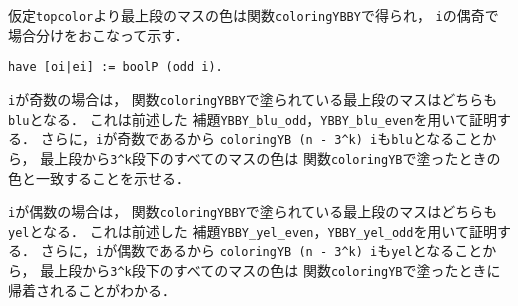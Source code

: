 仮定{\tt{topcolor}}より最上段のマスの色は関数{\tt{coloringYBBY}}で得られ，
{\tt{i}}の偶奇で場合分けをおこなって示す．
\begin{lstlisting}[language=Coq]
  have [oi|ei] := boolP (odd i).
\end{lstlisting}

{\tt{i}}が奇数の場合は，
関数{\tt{coloringYBBY}}で塗られている最上段のマスはどちらも{\tt{blu}}となる．
これは前述した
補題{\tt{YBBY\_blu\_odd}}，{\tt{YBBY\_blu\_even}}を用いて証明する．
さらに，{\tt{i}}が奇数であるから
{\tt{coloringYB (n - 3\verb|^|k) i}}も{\tt{blu}}となることから，
最上段から{\tt{3\verb|^|k}}段下のすべてのマスの色は
関数{\tt{coloringYB}}で塗ったときの色と一致することを示せる．

{\tt{i}}が偶数の場合は，
関数{\tt{coloringYBBY}}で塗られている最上段のマスはどちらも{\tt{yel}}となる．
これは前述した
補題{\tt{YBBY\_yel\_even}}，{\tt{YBBY\_yel\_odd}}を用いて証明する．
さらに，{\tt{i}}が偶数であるから
{\tt{coloringYB (n - 3\verb|^|k) i}}も{\tt{yel}}となることから，
最上段から{\tt{3\verb|^|k}}段下のすべてのマスの色は
関数{\tt{coloringYB}}で塗ったときに帰着されることがわかる．

